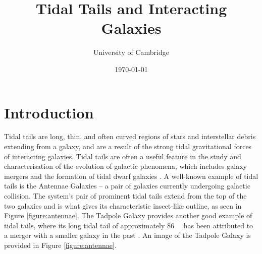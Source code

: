 \documentclass[twoside,twocolumn]{article}
\title{Tidal Tails and Interacting Galaxies} %
\author{%
    \normalsize University of Cambridge \\ %
    }
\date{
    \today \\
} %
\begin{document}
\maketitle

\section{Introduction}
    Tidal tails are long, thin, and often curved regions of stars and interstellar debris extending from a galaxy, and are a result of the strong tidal gravitational forces of interacting galaxies. Tidal tails are often a useful feature in the study and characterisation of the evolution of galactic phenomena, which includes galaxy mergers and the formation of tidal dwarf galaxies \cite{alavi}. A well-known example of tidal tails is the Antennae Galaxies -- a pair of galaxies currently undergoing galactic collision. The system's pair of prominent tidal tails extend from the top of the two galaxies and is what gives its characteristic insect-like outline, as seen in Figure \ref{figure:antennae}. The Tadpole Galaxy provides another good example of tidal tails, where its long tidal tail of approximately \SI{86}{\kilo\parsec} has been attributed to a merger with a smaller galaxy in the past \cite{tadpole}. An image of the Tadpole Galaxy is provided in Figure \ref{figure:antennae}.
    
\end{document}
